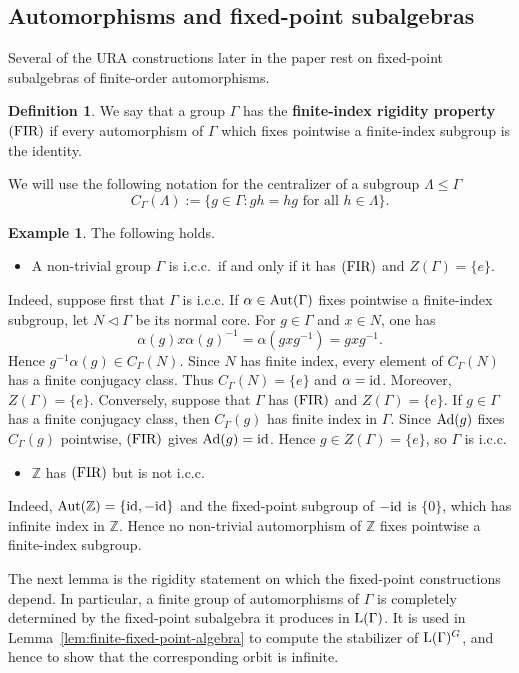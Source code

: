 \documentclass[12pt]{amsart} %
\theoremstyle{plain}
\theoremstyle{definition}
\newtheorem{definition}[theorem]{Definition}
\newtheorem{example}[theorem]{Example}
\newcommand{\id}{{\rm id}}
\newcommand{\LL}{{\rm L}}
\newcommand{\Aut}{{\rm Aut}}
\newcommand{\Ad}{{\rm Ad}}
\begin{document}
\subsection{Automorphisms and fixed-point subalgebras}
Several of the URA constructions later in the paper rest on fixed-point
subalgebras of finite-order automorphisms.
\begin{definition}\label{def:FIR}
We say that a group $\Gamma$ has the
\textbf{finite-index rigidity property ${\rm(FIR)}$} if every automorphism of
$\Gamma$ which fixes pointwise a finite-index subgroup is the identity.
\end{definition}
\noindent We will use the following notation for the centralizer of a subgroup $\Lambda\leq\Gamma$
$$C_\Gamma(\Lambda):=\{g\in\Gamma:gh=hg\text{ for all }h\in\Lambda\}.$$
\begin{example}
The following holds.
\begin{itemize}
\item A non-trivial group $\Gamma$ is i.c.c.\ if and only if it has
${\rm(FIR)}$ and $Z(\Gamma)=\{e\}$.
\end{itemize}
\noindent Indeed, suppose first that $\Gamma$ is i.c.c. If
$\alpha\in\Aut(\Gamma)$ fixes pointwise a finite-index subgroup, let
$N\triangleleft\Gamma$ be its normal core. For $g\in\Gamma$ and $x\in N$,
one has
$$
\alpha(g)x\alpha(g)^{-1}
=\alpha(gxg^{-1})
=gxg^{-1}.
$$
Hence $g^{-1}\alpha(g)\in C_\Gamma(N)$. Since $N$ has finite index, every
element of $C_\Gamma(N)$ has a finite conjugacy class. Thus
$C_\Gamma(N)=\{e\}$ and $\alpha=\id$. Moreover, $Z(\Gamma)=\{e\}$. Conversely, suppose that $\Gamma$ has ${\rm(FIR)}$ and
$Z(\Gamma)=\{e\}$. If $g\in\Gamma$ has a finite conjugacy class, then
$C_\Gamma(g)$ has finite index in $\Gamma$. Since $\Ad(g)$ fixes
$C_\Gamma(g)$ pointwise, ${\rm(FIR)}$ gives $\Ad(g)=\id$. Hence
$g\in Z(\Gamma)=\{e\}$, so $\Gamma$ is i.c.c.
\begin{itemize}
\item $\mathbb Z$ has ${\rm(FIR)}$ but is not i.c.c.
\end{itemize}
\noindent Indeed, $\Aut(\mathbb Z)=\{\id,-\id\}$ and the fixed-point
subgroup of $-\id$ is $\{0\}$, which has infinite index in $\mathbb Z$.
Hence no non-trivial automorphism of $\mathbb Z$ fixes pointwise a
finite-index subgroup.
\end{example}

\noindent The next lemma is the rigidity statement on which the fixed-point
constructions depend. In particular, a finite group of automorphisms of $\Gamma$ is completely
determined by the fixed-point subalgebra it produces in $\LL(\Gamma)$. It is
used in Lemma~\ref{lem:finite-fixed-point-algebra} to compute the stabilizer of
$\LL(\Gamma)^G$, and hence to show that the corresponding orbit is infinite.
\medskip
\end{document}
